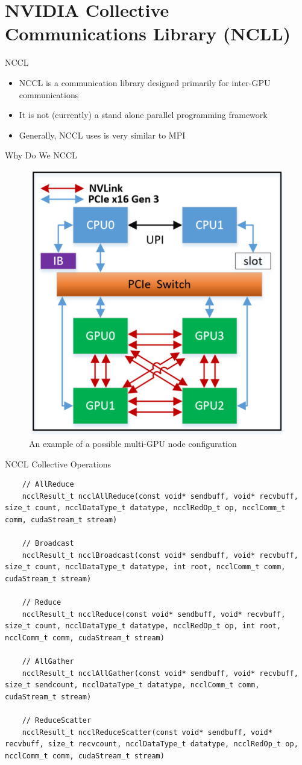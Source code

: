 \section{NVIDIA Collective Communications Library (NCLL)}

\begin{frame}{NCCL}
\begin{itemize}
\item NCCL is a communication library designed primarily for inter-GPU communications
\item It is not (currently) a stand alone parallel programming framework 
\item Generally, NCCL uses is very similar to MPI
\end{itemize}
\end{frame}

\begin{frame}{Why Do We NCCL}
	\begin{figure}
		\centering
		\includegraphics[width=0.45\linewidth]{figures/example_gpu_node_interconnect.png}
		\caption{An example of a possible multi-GPU node configuration}
	\end{figure}
\end{frame}

\begin{frame}[fragile]{NCCL Collective Operations}

\begin{verbatim}
	// AllReduce
	ncclResult_t ncclAllReduce(const void* sendbuff, void* recvbuff, size_t count, ncclDataType_t datatype, ncclRedOp_t op, ncclComm_t comm, cudaStream_t stream)
	
	// Broadcast
	ncclResult_t ncclBroadcast(const void* sendbuff, void* recvbuff, size_t count, ncclDataType_t datatype, int root, ncclComm_t comm, cudaStream_t stream)
	
	// Reduce
	ncclResult_t ncclReduce(const void* sendbuff, void* recvbuff, size_t count, ncclDataType_t datatype, ncclRedOp_t op, int root, ncclComm_t comm, cudaStream_t stream)
	
	// AllGather
	ncclResult_t ncclAllGather(const void* sendbuff, void* recvbuff, size_t sendcount, ncclDataType_t datatype, ncclComm_t comm, cudaStream_t stream)
	
	// ReduceScatter
	ncclResult_t ncclReduceScatter(const void* sendbuff, void* recvbuff, size_t recvcount, ncclDataType_t datatype, ncclRedOp_t op, ncclComm_t comm, cudaStream_t stream)
\end{verbatim}
\end{frame}

